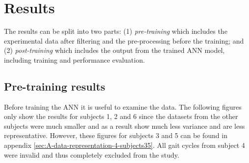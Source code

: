 \documentclass[../main.tex]{subfiles}
\begin{document}
\chapter{Results}
\label{sec:results}
The results can be split into two parts: (1) \textit{pre-training} which includes the experimental data after filtering and the pre-processing before the training; and (2) \textit{post-training} which includes the output from the trained \ac{ANN} model, including training and performance evaluation.

\section{Pre-training results}
\label{sec:results_pre-training-results}
Before training the \ac{ANN} it is useful to examine the data.
The following figures only show the results for subjects 1, 2 and 6 since the datasets from the other subjects were much smaller and as a result show much less variance and are less representative.
However, these figures for subjects 3 and 5 can be found in appendix \ref{sec:A-data-representation-4-subjects35}.
All gait cycles from subject 4 were invalid and thus completely excluded from the study.
\end{document}
